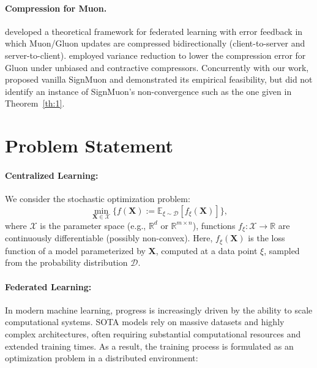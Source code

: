 \documentclass[letterpaper]{article} %
\begin{document}
\paragraph{Compression for Muon.} \citet{gruntkowska2025error} developed a theoretical framework for federated learning with error feedback in which Muon/Gluon \citep{riabinin2025gluon} updates are compressed bidirectionally (client-to-server and server-to-client). \citet{qian2026communicationefficientgluon} employed variance reduction to lower the compression error for Gluon under unbiased and contractive compressors. Concurrently with our work, \citet{mishra2026signmuon} proposed vanilla SignMuon and demonstrated its empirical feasibility, but did not identify an instance of SignMuon's non-convergence such as the one given in Theorem~\ref{th:1}.

\section{Problem Statement}\label{sec:proState}

\paragraph{Centralized Learning:} We consider the stochastic optimization problem:
\begin{equation}
\min_{\mathbf{X} \in \mathcal{X}} \{f(\mathbf{X}) := \mathbb{E}_{\xi \sim \mathcal{D}} [f_{\xi}(\mathbf{X})]\},
\end{equation}
where $\mathcal{X}$ is the parameter space (e.g., $\mathbb{R}^d$ or $\mathbb{R}^{m \times n}$), functions $f_{\xi} : \mathcal{X} \to \mathbb{R}$ are continuously differentiable (possibly non-convex). Here, $f_{\xi}(\mathbf{X})$ is the loss function of a model parameterized by $\mathbf{X}$, computed at a data point $\xi$, sampled from the probability distribution $\mathcal{D}$.

\paragraph{Federated Learning:} 
In modern machine learning, progress is increasingly driven by the ability to scale computational systems. SOTA models rely on massive datasets and highly complex architectures, often requiring substantial computational resources and extended training times. As a result, the training process is formulated as an optimization problem in a distributed environment:
\end{document}

